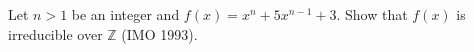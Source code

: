 Let $n > 1$ be an integer and $f(x) = x^n + 5x^{n-1} + 3$. Show that $f(x)$ is irreducible over $\mathbb{Z}$ (IMO 1993).
